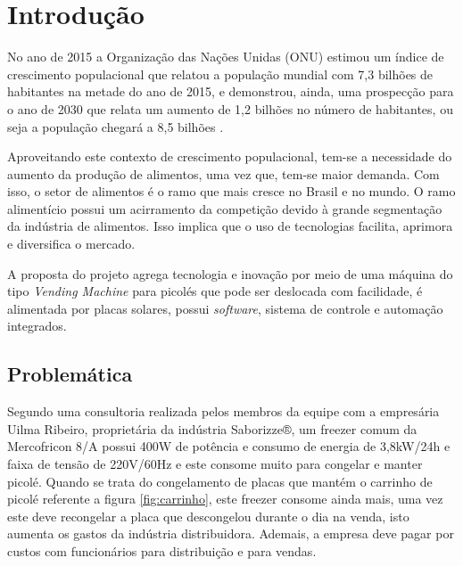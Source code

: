 \chapter{Introdução}

 No ano de 2015 a Organização das Nações Unidas (ONU) estimou um índice  de crescimento populacional que relatou a população mundial com 7,3 bilhões de habitantes na metade do ano de 2015, e  demonstrou, ainda, uma prospecção para o ano de 2030 que relata um aumento de 1,2 bilhões no número de habitantes, ou seja a população chegará a
8,5 bilhões \cite {ONU}. 

Aproveitando este contexto de crescimento populacional, tem-se a necessidade do aumento da produção de alimentos, uma vez que, tem-se maior demanda. Com isso, o setor de alimentos é o ramo que mais cresce no Brasil e no mundo. O ramo alimentício possui um acirramento da competição devido à grande segmentação da indústria de alimentos. Isso implica que o uso de tecnologias facilita, aprimora e diversifica o mercado. \cite{IBIA}

A proposta do projeto agrega tecnologia e inovação por meio de uma máquina do tipo \textit{Vending Machine} para picolés que pode ser deslocada com facilidade, é alimentada por placas solares, possui \textit{software}, sistema de controle e automação integrados.

\section{Problemática}

Segundo uma consultoria realizada pelos membros da equipe com a empresária Uilma Ribeiro, proprietária da indústria Saborizze®, um freezer comum da Mercofricon 8/A possui 400W de potência e consumo de energia de 3,8kW/24h e faixa de tensão de 220V/60Hz e este consome muito para congelar e manter picolé. Quando se trata do congelamento de placas que mantém o carrinho de picolé referente a figura \ref{fig:carrinho}, este freezer consome ainda mais, uma vez este deve recongelar a placa que descongelou durante o dia na venda, isto aumenta os gastos da indústria distribuidora. Ademais, a empresa deve pagar por custos com funcionários para distribuição e para vendas. 

